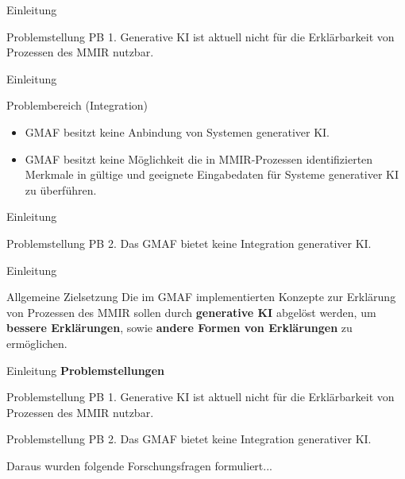 \documentclass[t]{beamer}
\begin{document}
\begin{frame}{Einleitung}
  \begin{alertblock}{Problemstellung PB 1.}
    Generative KI ist aktuell nicht für die Erklärbarkeit von Prozessen des MMIR nutzbar.
  \end{alertblock}
\end{frame}

\begin{frame}{Einleitung}
  \begin{block}{Problembereich (Integration)}
    \begin{itemize}
      \item<+-> GMAF besitzt keine Anbindung von Systemen generativer KI.
      \item<+-> GMAF besitzt keine Möglichkeit die in MMIR-Prozessen identifizierten Merkmale in gültige und geeignete Eingabedaten für Systeme generativer KI zu überführen.
    \end{itemize}
  \end{block}
\end{frame}

\begin{frame}{Einleitung}
  \begin{alertblock}{Problemstellung PB 2.}
    Das GMAF bietet keine Integration generativer KI.
  \end{alertblock}
\end{frame}

\begin{frame}{Einleitung}

  \begin{exampleblock}{Allgemeine Zielsetzung}
    Die im GMAF implementierten Konzepte zur Erklärung von Prozessen des MMIR sollen durch \textbf{generative KI} abgelöst werden, um \textbf{bessere Erklärungen}, sowie \textbf{andere Formen von Erklärungen} zu ermöglichen.
  \end{exampleblock}

\end{frame}

\begin{frame}{Einleitung}
  \textbf{Problemstellungen}

  \begin{alertblock}{Problemstellung PB 1.}
    Generative KI ist aktuell nicht für die Erklärbarkeit von Prozessen des MMIR nutzbar.
  \end{alertblock}

  \begin{alertblock}{Problemstellung PB 2.}
    Das GMAF bietet keine Integration generativer KI.
  \end{alertblock}
  Daraus wurden folgende Forschungsfragen formuliert...
\end{frame}
\end{document}

